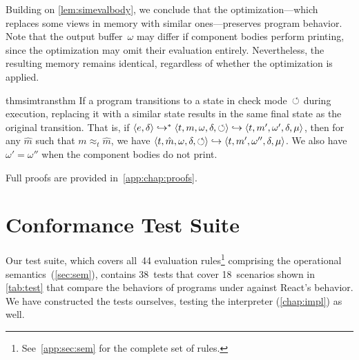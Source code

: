 Building on \cref{lem:simevalbody}, we conclude that the optimization---which replaces some views in memory with similar ones---preserves program behavior.
Note that the output buffer~$\omega$ may differ if component bodies perform printing,
since the optimization may omit their evaluation entirely.
Nevertheless, the resulting memory remains identical, regardless of whether the optimization is applied.

\begin{restatable}{thm}{simtransthm}\label{thm:simtrans}
  If a program transitions to a state in check mode~$\circlearrowleft$ during execution, replacing it with a similar state results in the same final state as the original transition.
  That is, if $\langle e,\delta\rangle \hookrightarrow^* \langle t,m,\omega,\delta,\circlearrowleft\rangle \hookrightarrow \langle t,m',\omega',\delta,\mu\rangle$, then for any $\hat m$ such that $m \approx_t \hat m$, we have $\langle t,\hat m,\omega,\delta,\circlearrowleft\rangle \hookrightarrow \langle t,m',\omega'',\delta,\mu\rangle$.
  We also have~$\omega' = \omega''$ when the component bodies do not print.
\end{restatable}

Full proofs are provided in~\cref{app:chap:proofs}.

\section{Conformance Test Suite}\label{sec:tests}
Our test suite, which covers all~44 evaluation rules\footnote{See~\cref{app:sec:sem} for the complete set of rules.} comprising the operational semantics~(\cref{sec:sem}), contains 38~tests that cover 18~scenarios shown in \cref{tab:test} that compare the behaviors of programs under \Rtrace{} against React's behavior.
We have constructed the tests ourselves, testing the \Rtrace{} interpreter (\cref{chap:impl}) as well.

